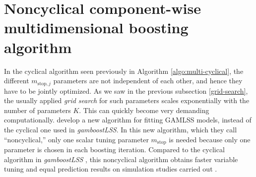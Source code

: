\section{Noncyclical component-wise multidimensional boosting algorithm}
In the cyclical algorithm seen previously in Algorithm \ref{algo:multi-cyclical}, the different $m_{\text{stop},j}$ parameters are not independent of each other, and hence they have to be jointly optimized.
As we saw in the previous subsection \ref{grid-search}, the usually applied \textit{grid search} for such parameters scales exponentially with the number of parameters $K$.
This can quickly become very demanding computationally.
\citet{thomas2018} develop a new algorithm for fitting GAMLSS models, instead of the cyclical one used in \textit{gamboostLSS}.
In this new algorithm, which they call ``noncyclical,'' only one scalar tuning parameter $m_{\text{stop}}$ is needed because only one parameter is chosen in each boosting iteration.
Compared to the cyclical algorithm in \textit{gamboostLSS} \citep{gamboostlss-paper}, this noncyclical algorithm obtains faster variable tuning and equal prediction results on simulation studies carried out \citep{thomas2018}.

